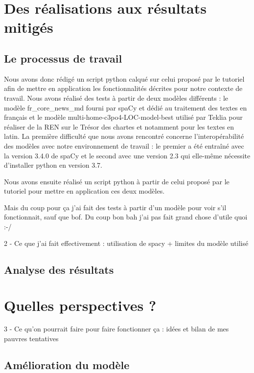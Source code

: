 \documentclass[a4paper,12pt,twoside]{book}
\begin{document}
	
	\section{Des réalisations aux résultats mitigés}
	
	\subsection{Le processus de travail}
	
	Nous avons donc rédigé un script python calqué sur celui proposé par le tutoriel afin de mettre en application les fonctionnalités décrites pour notre contexte de travail. Nous avons réalisé des tests à partir de deux modèles différents : le modèle \og fr\_core\_news\_md\fg{} fourni par spaCy et dédié au traitement des textes en français et le modèle \og multi-home-c3po4-LOC-model-best\fg{} utilisé par Teklia pour réaliser de la REN sur le Trésor des chartes et notamment pour les textes en latin. La première difficulté que nous avons rencontré concerne l'interopérabilité des modèles avec notre environnement de travail : le premier a été entraîné avec la version 3.4.0 de spaCy et le second avec une version 2.3 qui elle-même nécessite d'installer python en version 3.7.
	
	Nous avons ensuite réalisé un script python à partir de celui proposé par le tutoriel pour mettre en application ces deux modèles. 
	
	
	Mais du coup pour ça j'ai fait des tests à partir d'un modèle pour voir s'il fonctionnait, sauf que bof. Du coup bon bah j'ai pas fait grand chose d'utile quoi :-/
	
	
	2 - Ce que j'ai fait effectivement : utilisation de spacy + limites du modèle utilisé
	
	\subsection{Analyse des résultats}
	
	\section{Quelles perspectives ?}
	
	3 - Ce qu'on pourrait faire pour faire fonctionner ça : idées et bilan de mes pauvres tentatives
	
	\subsection{Amélioration du modèle}
	
\end{document}
